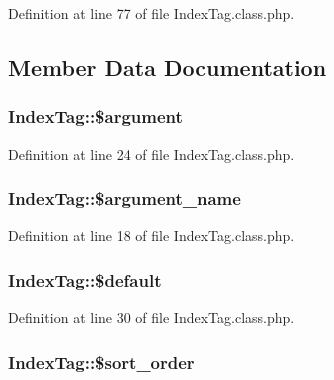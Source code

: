 Definition at line 77 of file Index\-Tag.\-class.\-php.



\subsection{Member Data Documentation}
\hypertarget{classIndexTag_a5d1d862f8c1ebcd6ddb15bb2c9da2e4b}{
\subsubsection[{\$argument}]{\setlength{\rightskip}{0pt plus 5cm}Index\-Tag\-::\$argument}}\label{classIndexTag_a5d1d862f8c1ebcd6ddb15bb2c9da2e4b}


Definition at line 24 of file Index\-Tag.\-class.\-php.

\hypertarget{classIndexTag_a92f6892b11fed081293fdaabb58f36a0}{
\subsubsection[{\$argument\-\_\-name}]{\setlength{\rightskip}{0pt plus 5cm}Index\-Tag\-::\$argument\-\_\-name}}\label{classIndexTag_a92f6892b11fed081293fdaabb58f36a0}


Definition at line 18 of file Index\-Tag.\-class.\-php.

\hypertarget{classIndexTag_ae24a36bb56ebc33a9161a64b12f92f18}{
\subsubsection[{\$default}]{\setlength{\rightskip}{0pt plus 5cm}Index\-Tag\-::\$default}}\label{classIndexTag_ae24a36bb56ebc33a9161a64b12f92f18}


Definition at line 30 of file Index\-Tag.\-class.\-php.

\hypertarget{classIndexTag_a68336fd5e6a3fa09e2659359cce027fb}{
\subsubsection[{\$sort\-\_\-order}]{\setlength{\rightskip}{0pt plus 5cm}Index\-Tag\-::\$sort\-\_\-order}}\label{classIndexTag_a68336fd5e6a3fa09e2659359cce027fb}


